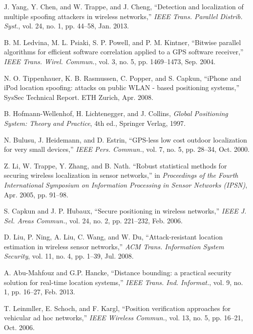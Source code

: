 \documentclass[journal]{IEEEtran}
\begin{document}
\begin{thebibliography}{1}
 J. Yang, Y. Chen, and W. Trappe, and J. Cheng, ``Detection and localization of multiple spoofing attackers in wireless networks,'' \emph{IEEE Trans. Parallel Distrib. Syst.}, vol. 24, no. 1, pp. 44--58, Jan. 2013.


 B. M. Ledvina, M. L. Psiaki, S. P. Powell, and P. M. Kintner, ``Bitwise parallel algorithms for efficient software correlation applied to a GPS software receiver,'' \emph{IEEE Trans. Wirel. Commun.}, vol. 3, no. 5, pp. 1469--1473, Sep. 2004.

 N. O. Tippenhauer, K. B. Rasmussen, C. Popper, and S. Capkun, ``iPhone and iPod location spoofing: attacks on public WLAN - based positioning systems,'' SysSec Technical Report. ETH Zurich, Apr. 2008.


 B. Hofmann-Wellenhof, H. Lichtenegger, and J. Collins, \emph{Global Positioning System: Theory and Practice}, 4th ed., Springer Verlag, 1997.

 N. Bulusu, J. Heidemann, and D. Estrin, ``GPS-less low cost outdoor localization for very small devices,'' \emph{IEEE Pers. Commun.}, vol. 7, no. 5, pp. 28--34, Oct. 2000.

 Z. Li, W. Trappe, Y. Zhang, and B. Nath. ``Robust statistical methods for
securing wireless localization in sensor networks,'' in \emph{Proceedings of the
Fourth International Symposium on Information Processing in Sensor
Networks (IPSN)}, Apr. 2005, pp. 91--98.

 S. Capkun and J. P. Hubaux, ``Secure positioning in wireless networks,''
\emph{IEEE J. Sel. Areas Commun.}, vol. 24, no. 2, pp. 221--232, Feb. 2006.

 D. Liu, P. Ning, A. Liu, C. Wang, and W. Du, ``Attack-resistant location estimation in wireless sensor networks,'' \emph{ACM Trans. Information System Security}, vol. 11, no. 4, pp. 1--39, Jul. 2008.

 A. Abu-Mahfouz and G.P. Hancke, ``Distance bounding: a practical security solution for real-time location systems,''  \emph{IEEE Trans. Ind. Informat.}, vol. 9, no. 1, pp. 16--27, Feb. 2013.




 T. Leinmller, E. Schoch, and F. Kargl, ``Position verification approaches for vehicular ad hoc networks,'' \textit{IEEE Wireless Commun.}, vol. 13, no. 5, pp. 16--21, Oct. 2006.


\end{thebibliography}
\end{document}
